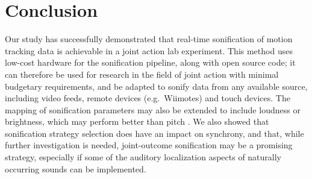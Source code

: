 \documentclass[10pt,a4paper,onecolumn]{article}
\begin{document}
\hypertarget{conclusion}{%
\section{Conclusion}\label{conclusion}}

Our study has successfully demonstrated that real-time sonification of motion tracking data is achievable in a joint action lab experiment. This method uses low-cost hardware for the sonification pipeline, along with open source code; it can therefore be used for research in the field of joint action with minimal budgetary requirements, and be adapted to sonify data from any available source, including video feeds, remote devices (e.g.~Wiimotes) and touch devices. The mapping of sonification parameters may also be extended to include loudness or brightness, which may perform better than pitch \autocite{mcdermottMusicalIntervalsRelative2010}. We also showed that sonification strategy selection does have an impact on synchrony, and that, while further investigation is needed, joint-outcome sonification may be a promising strategy, especially if some of the auditory localization aspects of naturally occurring sounds can be implemented.
\balance
\clearpage


\printbibliography[title=References,heading=bibintoc]
\end{document}
